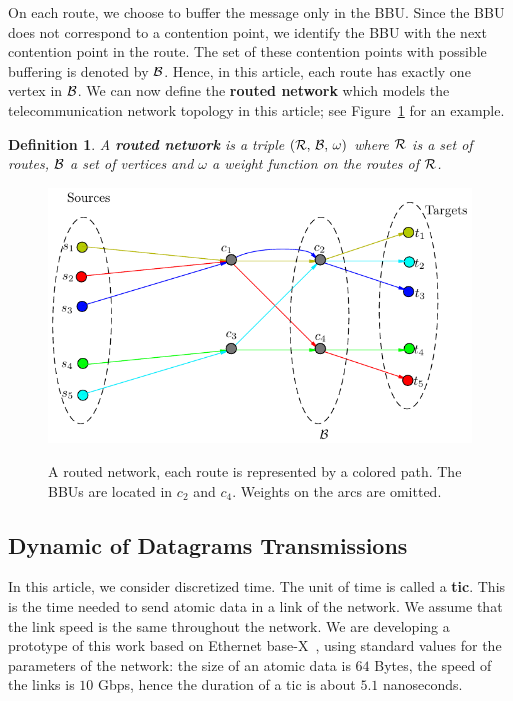 \documentclass[a4paper,10pt]{journal}
\newtheorem{definition}{Definition}
\begin{document}
  	On each route, we choose to buffer the message only in the BBU. Since the BBU does not correspond to a contention point, we identify the BBU with the next contention point in the route. The set of these contention points with possible buffering is denoted by ${\cal B}$. Hence, in this article, each route has exactly one vertex in $\cal{B}$. We can now define the \textbf{routed network} which models the telecommunication network topology in this article; see Figure~\ref{fig:graphmodel} for an example. 


  	\begin{definition}
    A \textbf{routed network} is a triple $(\cal{R},\,\cal{B},\,\omega)$ where $\cal{R}$ is a set of routes, $\cal{B}$ a set of vertices and $\omega$ a weight function on the routes of $\cal{R}$. 
    \end{definition}
     


\begin{figure}
\centering

	
	\includegraphics[scale=0.7]{graphmodel.pdf}\\

\caption{A routed network, each route is represented by a colored path. The BBUs are located in $c_2$ and $c_4$. Weights on the arcs are omitted.}
\label{fig:graphmodel}
\end{figure} 
 

	 
	 
 	\subsection{Dynamic of Datagrams Transmissions}
	    
 		In this article, we consider discretized time. The unit of time is called a {\bf tic}. This is the time needed to send atomic data in a link of the network. We assume that the link speed is the same throughout the network.  We are developing a prototype of this work based on Ethernet base-X~\cite{ieee_8023}, using standard values for the parameters of the network: the size of an atomic data is $64$ Bytes, the speed of the links is $10$ Gbps, hence the duration of a tic is about $5.1$ nanoseconds. 
\end{document}
